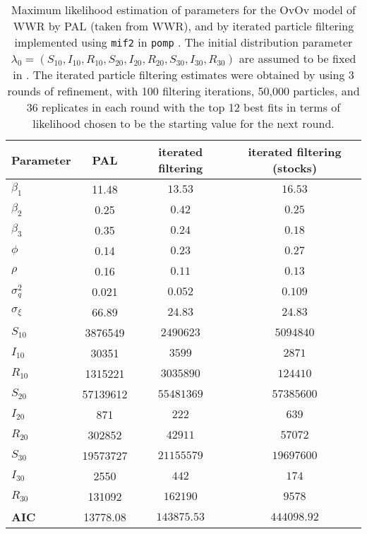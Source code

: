 \documentclass[10pt]{article}\usepackage[]{graphicx}\usepackage[]{xcolor}
\begin{document}
\begin{table}[htbp]
    \caption{Maximum likelihood estimation of parameters for the OvOv model of WWR by PAL (taken from WWR), and by iterated particle filtering implemented using {\rm \texttt{mif2}} in {\rm \texttt{pomp}} \citep{pomppackagepaper}. The initial distribution parameter \(\lambda_0 = (S_{10}, I_{10}, R_{10}, S_{20}, I_{20}, R_{20}, S_{30}, I_{30}, R_{30})\) are assumed to be fixed in \cite{wwr}. The iterated particle filtering estimates were obtained by using 3 rounds of refinement, with 100 filtering iterations, 50,000 particles, and 36 replicates in each round with the top 12 best fits in terms of likelihood chosen to be the starting value for the next round.}
    \label{tab:mlebywwr}
\begin{center}    
    \begin{tabular}{lccc}  %
      \toprule
      Parameter      & PAL      & iterated filtering & iterated filtering (stocks)\\
      \midrule
      \(\beta_1\)    & 11.48     & $13.53$ & $16.53$\\
      \(\beta_2\)    & 0.25      & $0.42$ & $0.25$\\
      \(\beta_3\)    & 0.35      & $0.24$ & $0.18$\\
      \(\phi\)       & 0.14      & $0.23$   & $0.27$\\
      \(\rho\)       & 0.16      & $0.11$ & $0.13$\\
      \(\sigma^2_q\) & 0.021     & $0.052$ & $0.109$\\
      \(\sigma_\xi\) & 66.89     & $24.83$ & $24.83$\\
      \(S_{10}\)     & 3876549   & $2490623$  & $5094840$\\
      \(I_{10}\)     & 30351     & $3599$  & $2871$\\
      \(R_{10}\)     & 1315221   & $3035890$  & $124410$\\
      \(S_{20}\)     & 57139612  & $55481369$  & $57385600$\\
      \(I_{20}\)     & 871       & $222$  & $639$\\
      \(R_{20}\)     & 302852    & $42911$  & $57072$\\
      \(S_{30}\)     & 19573727  & $21155579$  & $19697600$\\
      \(I_{30}\)     & 2550      & $442$  & $174$\\
      \(R_{30}\)     & 131092    & $162190$  & $9578$\\
      \midrule
      \textbf{AIC}  & 13778.08  & $143875.53$ & $444098.92$\\
      \bottomrule
    \end{tabular}
\end{center}
\end{table}
\end{document}
